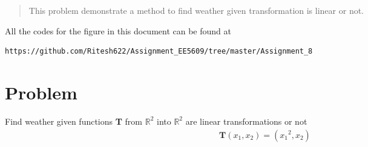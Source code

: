 \documentclass[journal,12pt,twocolumn]{IEEEtran}
\begin{document}
	
	\maketitle
	\newpage
	\bigskip
	\renewcommand{\thefigure}{\theenumi}
	\renewcommand{\thetable}{\theenumi}
	\date{Today}
	
\begin{abstract}
This problem demonstrate a method to  find weather given transformation is linear  or not.
\end{abstract}
All the codes for the figure in this document can be found at
\begin{lstlisting}
https://github.com/Ritesh622/Assignment_EE5609/tree/master/Assignment_8
\end{lstlisting}
\section{\textbf{Problem}}
 Find weather given  functions \textbf{T} from $\mathbb{R}^2$ into $\mathbb{R}^2$ are linear transformations or not
\begin{align}
	\textbf{T}(x_1,x_2) = ({x_1}^2,x_2)
\end{align}
\end{document}
